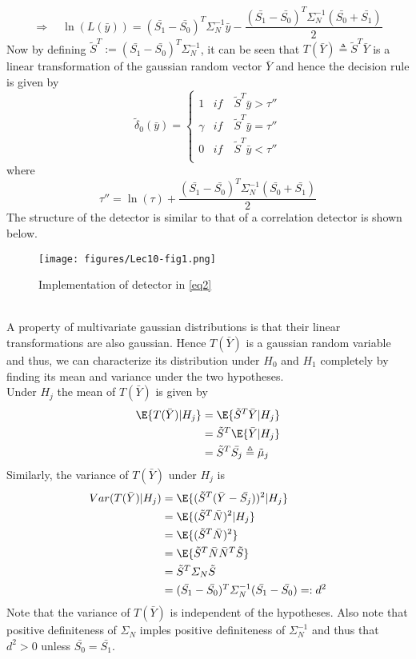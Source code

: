 \documentclass[12pt]{report}
\begin{document}
 
 \[\Rightarrow\quad\ln(L(\bar{y}))=(\bar{S_1}-\bar{S_0})^T{\varSigma_{N}^{-1}}{\bar{y}}-{\frac{(\bar{S_1}-\bar{S_0})^T{\varSigma_{N}^{-1}}(\bar{S_0}+\bar{S_1})}{2}}\]\noindent Now by defining $\tilde{S}^T:=(\bar{S_1}-\bar{S_0})^T{\varSigma_{N}^{-1}}$, it can be seen that $T(\bar{Y}) \triangleq \tilde{S}^T\bar{Y}$ is a linear transformation of the gaussian random vector $\bar{Y}$ and hence the decision rule is given by
\begin{equation}
\label{eq2}\tilde{\delta}_0 (\bar{y})=
\begin{cases}
1 &if \quad\tilde{S}^T\bar{y}>\tau''   \\
\gamma &if\quad\tilde{S}^T\bar{y}= \tau''\\
0 &if\quad\tilde{S}^T\bar{y} <\tau''\\
\end{cases}
\end{equation}
where
\[\tau''=\ln(\tau)+{\frac{(\bar{S_1}-\bar{S_0})^T\varSigma_{N}^{-1}(\bar{S_0}+\bar{S_1})}{2}}\]
The structure of the detector is similar to that of a correlation detector is shown below.
\begin{figure}
	\begin{center}
	\texttt{[image: figures/Lec10-fig1.png]}
	\caption{Implementation of detector in \eqref{eq2}}
\end{center}
\end{figure}\\
\indent A property of multivariate gaussian distributions is that their linear transformations are also gaussian. Hence $T(\bar{Y})$ is a gaussian random variable and thus, we can characterize its distribution under $H_0$ and $H_1$ completely by finding its mean and variance under the two hypotheses.\\\indent Under $H_j$ the mean of $T(\bar{Y})$ is given by
\begin{align*}
 \E\lbrace T(\bar{Y})|H_j\rbrace &=\E\lbrace \tilde{S}^T\bar{Y}|H_j\rbrace\\&=\tilde{S}^T\E\lbrace\bar{Y}|H_j\rbrace\\&=\tilde{S}^T\bar{S_j}\triangleq\tilde\mu_j
\end{align*}
  Similarly, the variance of $T(\bar{Y})$ under $H_j$ is 
  \begin{align*}
  Var(T(\bar{Y})|H_j)&=\E\lbrace(\tilde{S}^T(\bar{Y}-\bar{S_j}))^2|H_j\rbrace\\&=\E\lbrace(\tilde{S}^T\bar{N})^2|H_j\rbrace\\&=\E\lbrace(\tilde{S}^T\bar{N})^2\rbrace\\&=\E\lbrace\tilde{S}^T\bar{N}\bar{N}^T\tilde{S}\rbrace
\\&=\tilde{S}^T\varSigma_{N}\tilde{S}\\&= (\bar{S_1}-\bar{S_0})^T{\varSigma_{N}^{-1}}(\bar{S_1}-\bar{S_0})=:d^2 \end{align*}
  Note that the variance of $T(\bar{Y})$ is independent of the hypotheses. Also note that positive definiteness of $\varSigma_{N}$ imples positive definiteness of $\varSigma_{N}^{-1}$ and thus that $d^2>0$ unless $\bar{S_0}=\bar{S_1}$.
  
\end{document}
